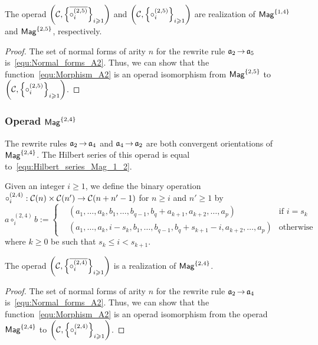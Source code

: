 \begin{Proposition} \label{prop:Realisation_Mag_1_4}
The operad
$\left(\mathcal{C}, \left\{\overline{\circ_i^{(2,5)}}\right\}_{i \geqslant 1}
\right)$ and
$\left(\mathcal{C}, \left\{\circ_i^{(2,5)}\right\}_{i \geqslant 1}\right)$
are realization of $\mathsf{Mag}^{\{1, 4\}}$ and $\mathsf{Mag}^{\{2, 5\}}$, respectively.
\end{Proposition}

\begin{proof}
The set of normal forms of arity $n$ for the rewrite rule
$\mathfrak{a}_2 \operatorname{\to} \mathfrak{a}_5$ is~\eqref{equ:Normal_forms_A2}. Thus, we can show
that the function~\eqref{equ:Morphism_A2} is an operad isomorphism from
$\mathsf{Mag}^{\{2, 5\}}$ to
$\left(\mathcal{C}, \left\{\circ_i^{(2,5)}\right\}_{i \geqslant 1}\right)$.
\end{proof}
\medbreak

\subsubsection{Operad $\mathsf{Mag}^{\{2, 4\}}$}
The rewrite rules $\mathfrak{a}_2 \operatorname{\to} \mathfrak{a}_4$ and $\mathfrak{a}_4 \operatorname{\to} \mathfrak{a}_2$ are both
convergent orientations of $\mathsf{Mag}^{\{2, 4\}}$. The Hilbert series of
this operad is equal to~\eqref{equ:Hilbert_series_Mag_1_2}.
\medbreak

Given an integer $i \geq 1$, we define the
binary operation
$\circ_i^{(2,4)} : \mathcal{C}(n) \times \mathcal{C}(n')\rightarrow
 \mathcal{C}(n + n' -1)$ for
$n \geq i$ and $n' \geq 1$ by
\begin{equation}
a \circ_i^{(2,4)} b := \left\{
    \begin{split}
    & (a_1, \dots, a_{k}, b_1, \dots, b_{q-1}, b_{q} + a_{k+1},
    a_{k+2}, \dots ,a_{p}) & \text{if } i = s_k\\
    & (a_1, \dots, a_{k}, i - s_{k}, b_1, \dots, b_{q-1}, b_{q}
     + s_{k+1} - i, a_{k+2}, \dots ,a_{p}) & \text{otherwise}
    \end{split}
  \right.
\end{equation}
where $k \geq 0$  be such that $s_k \leq i < s_{k+1}$.
\medbreak

\begin{Proposition} \label{prop:Realisation_Mag_2_4}
The operad
$\left(\mathcal{C}, \left\{\overline{\circ_i^{(2,4)}}\right\}_{i \geqslant 1}
\right)$ is a realization of $\mathsf{Mag}^{\{2, 4\}}$.
\end{Proposition}

\begin{proof}
The set of normal forms of arity $n$ for the rewrite rule
$\mathfrak{a}_2 \operatorname{\to} \mathfrak{a}_4$ is~\eqref{equ:Normal_forms_A2}. Thus, we can show
that the function~\eqref{equ:Morphism_A2} is an operad isomorphism from
the operad $\mathsf{Mag}^{\{2, 4\}}$ to
$\left(\mathcal{C}, \left\{\circ_i^{(2,4)}\right\}_{i \geqslant 1}\right)$.
\end{proof}
\medbreak

